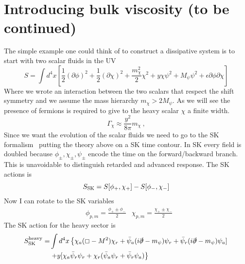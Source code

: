 \section{Introducing bulk viscosity (to be continued)}
The simple example one could think of to construct a dissipative system is to start with two scalar fluids in the UV
\begin{equation}
S=\int d^4x\left[\frac{1}{2}(\partial\phi)^2+\frac{1}{2}(\partial\chi)^2+\frac{m_\chi^2}{2}\chi^2+ y \chi \psi^2+ M_\psi\psi^2+ \epsilon\partial\phi \partial\chi\right]    
\end{equation}
Where we wrote an interaction between the two scalars that respect the shift symmetry and we assume the mass hierarchy $m_\chi>2 M_\psi$. As we will see the presence of fermions is required to give to the heavy scalar $\chi$ a finite width.  
\begin{equation}
\Gamma_\chi\approx\frac{y^2}{8\pi}m_\chi\ ,
\end{equation}
Since we want the evolution of the scalar fluids we need to go to the SK formalism~\cite{Crossley:2015evo,Liu:2018kfw} putting the theory above on a SK time contour. In SK every field is doubled because $\phi_{\pm}, \chi_{\pm},\psi_{\pm}$ encode the time on the forward/backward branch. This is unavoidable to distinguish retarded and advanced response. The SK actions is
\begin{equation}
S_{\rm{SK}}=S[\phi_+,\chi_+]-S[\phi_-,\chi_-]    
\end{equation}
Now I can rotate to the SK variables
\begin{align}
&\phi_{p,m}=\frac{\phi_+\pm \phi_-}{2}
&\chi_{p,m}=\frac{\chi_+\pm \chi_-}{2}
\end{align}
The SK action for the heavy sector is
\begin{equation}
\begin{split}
S^{\rm{heavy}}_{\rm SK}
=
&\int d^4x\left\{\chi_a (\Box - M^2) \chi_r
+
\bar{\psi}_a (i\slashed{\partial}-m_\psi)\psi_r
+
\bar{\psi}_r (i\slashed{\partial}-m_\psi)\psi_a
]\right.
\\
&\left.+y[
\chi_a \bar{\psi}_r \psi_r
+\chi_r(\bar{\psi}_a \psi_r + \bar{\psi}_r \psi_a)\right\}
\end{split}
\end{equation}
